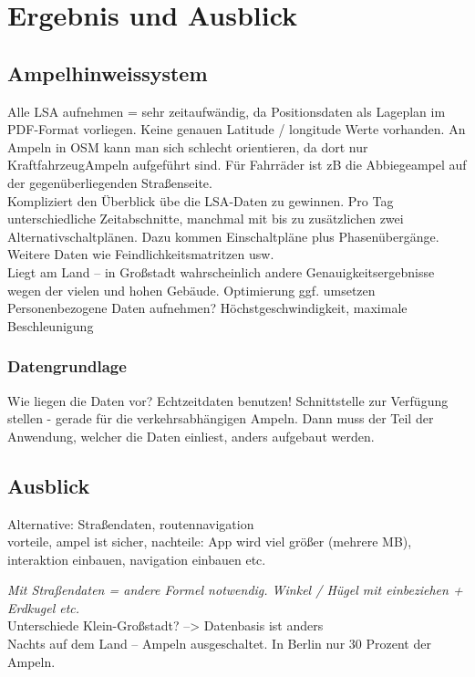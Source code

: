 \chapter{\label{chap:fazit}Ergebnis und Ausblick}
\section{Ampelhinweissystem}
Alle LSA aufnehmen = sehr zeitaufwändig, da Positionsdaten als Lageplan im \gls{PDF}-Format vorliegen. Keine genauen Latitude / longitude Werte vorhanden. An Ampeln in OSM kann man sich schlecht orientieren, da dort nur KraftfahrzeugAmpeln aufgeführt sind. Für Fahrräder ist zB die Abbiegeampel auf der gegenüberliegenden Straßenseite. \\
Kompliziert den Überblick übe die \gls{LSA}-Daten zu gewinnen. Pro Tag unterschiedliche Zeitabschnitte, manchmal mit bis zu zusätzlichen zwei Alternativschaltplänen. Dazu kommen Einschaltpläne plus Phasenübergänge. Weitere Daten wie Feindlichkeitsmatritzen usw.\\
 Liegt am Land -- in Großstadt wahrscheinlich andere Genauigkeitsergebnisse wegen der vielen und hohen Gebäude.
Optimierung ggf. umsetzen\\
Personenbezogene Daten aufnehmen? Höchstgeschwindigkeit, maximale Beschleunigung
\subsection{Datengrundlage}
Wie liegen die Daten vor? Echtzeitdaten benutzen! 
Schnittstelle zur Verfügung stellen - gerade für die verkehrsabhängigen Ampeln. Dann muss der Teil der Anwendung, welcher die Daten einliest, anders aufgebaut werden.

\section{Ausblick}

Alternative: Straßendaten, routennavigation\\ vorteile, ampel ist sicher, nachteile:
App wird viel größer (mehrere MB),  interaktion einbauen, navigation einbauen etc. 

\textit{Mit Straßendaten = andere Formel notwendig. Winkel / Hügel mit einbeziehen + Erdkugel etc.}\\

Unterschiede Klein-Großstadt? --> Datenbasis ist anders\\
Nachts auf dem Land -- Ampeln ausgeschaltet. In Berlin nur 30 Prozent der Ampeln.
